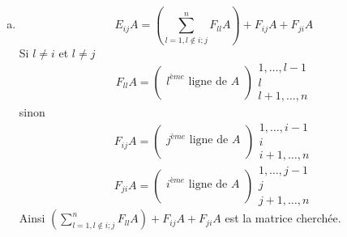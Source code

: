 \begin{enumerate}[a)]
  \item $$E_{ij} A = \left( \sum_{l=1, l \notin {i; j}}^n F_{ll} A \right) + F_{ij} A + F_{ji} A$$
    Si $l\neq i$ et $l\neq j$ 
    $$F_{ll} A =
      \begin{pmatrix}
        \\
        l^{ème} \text{ ligne de } A \\
        \\
      \end{pmatrix} \begin{array}{c} 1, \ldots, l-1 \\ l \\ l+1, \ldots, n \end{array}$$
    sinon
      $$F_{ij} A =
      \begin{pmatrix}
        \\
        j^{ème} \text{ ligne de } A \\
        \\
      \end{pmatrix} \begin{array}{c} 1, \ldots, i-1 \\ i \\ i+1, \ldots, n \end{array}$$
      $$F_{ji} A =
      \begin{pmatrix}
        \\
        i^{ème} \text{ ligne de } A \\
        \\
      \end{pmatrix} \begin{array}{c} 1, \ldots, j-1 \\ j \\ j+1, \ldots, n \end{array}$$
    Ainsi $\left( \sum_{l=1, l \notin {i; j}}^n F_{ll} A \right) + F_{ij} A + F_{ji} A$ est la matrice cherchée.
\end{enumerate}

